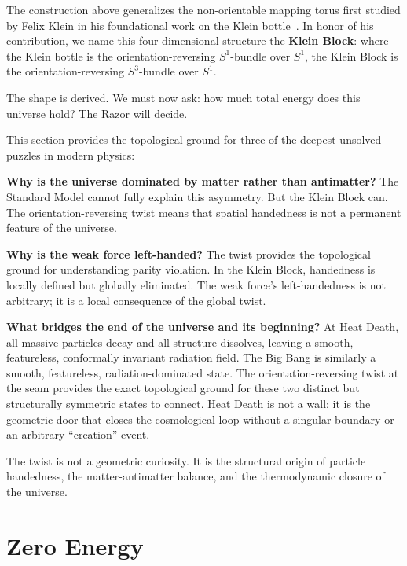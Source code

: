 \documentclass[11pt]{article}
\theoremstyle{canonstyle}
\begin{document}
The construction above generalizes the non-orientable mapping torus first studied by Felix Klein in his foundational work on the Klein bottle~\cite{Klein}. In honor of his contribution, we name this four-dimensional structure the \textbf{Klein Block}: where the Klein bottle is the orientation-reversing $S^1$-bundle over $S^1$, the Klein Block is the orientation-reversing $S^3$-bundle over $S^1$.

The shape is derived. We must now ask: how much total energy does this universe hold? The Razor will decide.

\newpage

\begin{realization}
This section provides the topological ground for three of the deepest unsolved puzzles in modern physics:

\medskip

\textbf{Why is the universe dominated by matter rather than antimatter?}
The Standard Model cannot fully explain this asymmetry. But the Klein Block can. The orientation-reversing twist means that spatial handedness is not a permanent feature of the universe.

\textbf{Why is the weak force left-handed?}
The twist provides the topological ground for understanding parity violation. In the Klein Block, handedness is locally defined but globally eliminated. The weak force's left-handedness is not arbitrary; it is a local consequence of the global twist.

\textbf{What bridges the end of the universe and its beginning?}
At Heat Death, all massive particles decay and all structure dissolves, leaving a smooth, featureless, conformally invariant radiation field. The Big Bang is similarly a smooth, featureless, radiation-dominated state. The orientation-reversing twist at the seam provides the exact topological ground for these two distinct but structurally symmetric states to connect. Heat Death is not a wall; it is the geometric door that closes the cosmological loop without a singular boundary or an arbitrary ``creation'' event.

\medskip

The twist is not a geometric curiosity. It is the structural origin of particle handedness, the matter-antimatter balance, and the thermodynamic closure of the universe.
\end{realization}

\newpage

\section{Zero Energy}
\end{document}
